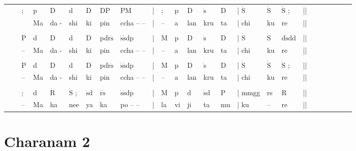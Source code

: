 \documentclass[12pt]{article}
\newcommand*\od[1]{\mathrm{\dot{#1}}}
\begin{document}
\begin{tabu}{l l l l l l l l l l l l l l l l l l l l l l l l l }

&&;&p&D&d&D&DP&PM&|&;&p&D&$\od{s}$&D&| $\od{S}$&$\od{S}$& $\od{S}$ ;&||\\
\rowfont{\scriptsize}&& &Ma&da -&shi&ki&pin&ccha -- --&|&--&a&lan& kru&ta&| chi&ku& re&||\\
\\
&&P&d&D&d&D&pd$\od{r}$$\od{s}$&$\od{s}$$\od{s}$dp&|&M&p&D&$\od{s}$&D&| $\od{S}$&$\od{S}$& d$\od{s}$dd&||\\
\rowfont{\scriptsize}&&--&Ma&da -&shi&ki&pin&ccha -- --&|&--&a&lan& kru&ta&| chi&ku& re&||\\
\\
&&P&d&D&d&D&pd$\od{r}$$\od{s}$&$\od{s}$$\od{s}$dp&|&M&p&D&$\od{s}$&D&| $\od{S}$&$\od{S}$& $\od{S}$ ;&||\\
\rowfont{\scriptsize}&&--&Ma&da -&shi&ki&pin&ccha -- --&|&--&a&lan& kru&ta&| chi&ku& re&||\\
\\
&&;&d&$\od{R}$&$\od{S}$ ;&$\od{s}$d&$\od{r}$$\od{s}$&$\od{s}$$\od{s}$dp&|&M&p&d&$\od{s}$d&P&| mmgg&rs& R&||\\
\rowfont{\scriptsize}&&--&Ma&ha&nee&ya&ka&po -- --&|&la&vi&ji& ta&mu&| ku&--& re&||\\
\end{tabu}

\section*{Charanam 2}
\end{document}
